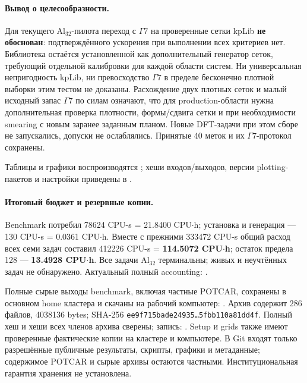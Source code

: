 \documentclass[11pt,a4paper]{article}
\begin{document}
\paragraph{Вывод о целесообразности.}
Для текущего Al$_{32}$-пилота переход с $\Gamma7$ на проверенные сетки
kpLib \textbf{не обоснован}: подтверждённого ускорения при выполнении
всех критериев нет. Библиотека остаётся установленной как дополнительный
генератор сеток, требующий отдельной калибровки для каждой области систем.
Ни универсальная непригодность kpLib, ни превосходство $\Gamma7$ в
пределе бесконечно плотной выборки этим тестом не доказаны.
Расхождение двух плотных сеток и малый исходный запас $\Gamma7$ по силам
означают, что для production-области нужна дополнительная проверка
плотности, формы/сдвига сетки и при необходимости smearing с новым
заранее заданным планом. Новые DFT-задачи при этом сборе не запускались,
допуски не ослаблялись. Принятые 40 меток и их $\Gamma7$-протокол сохранены.

Таблицы и графики воспроизводятся
; хеши входов/выходов,
версии plotting-пакетов и настройки приведены в
.

\paragraph{Итоговый бюджет и резервные копии.}
Benchmark потребил 78624 CPU-s = 21.8400 CPU$\cdot$h;
установка и генерация --- 130 CPU-s = 0.0361 CPU$\cdot$h.
Вместе с прежними 333472 CPU-s общий расход всех семи задач
составил 412226 CPU-s = \textbf{114.5072 CPU$\cdot$h};
остаток предела 128 --- \textbf{13.4928 CPU$\cdot$h}.
Все задачи Al$_{32}$ терминальны; живых и неучтённых задач не обнаружено.
Актуальный полный accounting:
.

Полные сырые выходы benchmark, включая частные POTCAR, сохранены
в основном home кластера и скачаны на рабочий компьютер:
.
Архив содержит 286 файлов, 4038136 bytes;
SHA-256 \texttt{ee9f715bade24935\ldots{}5fbb110a81dd4f}.
Полный хеш и хеши всех членов архива сверены; запись:
.
Setup и grids также имеют проверенные фактические копии на кластере
и компьютере. В Git входят только разрешённые публичные результаты,
скрипты, графики и метаданные; содержимое POTCAR и сырые архивы
остаются частными. Институциональная гарантия хранения не установлена.
\end{document}
